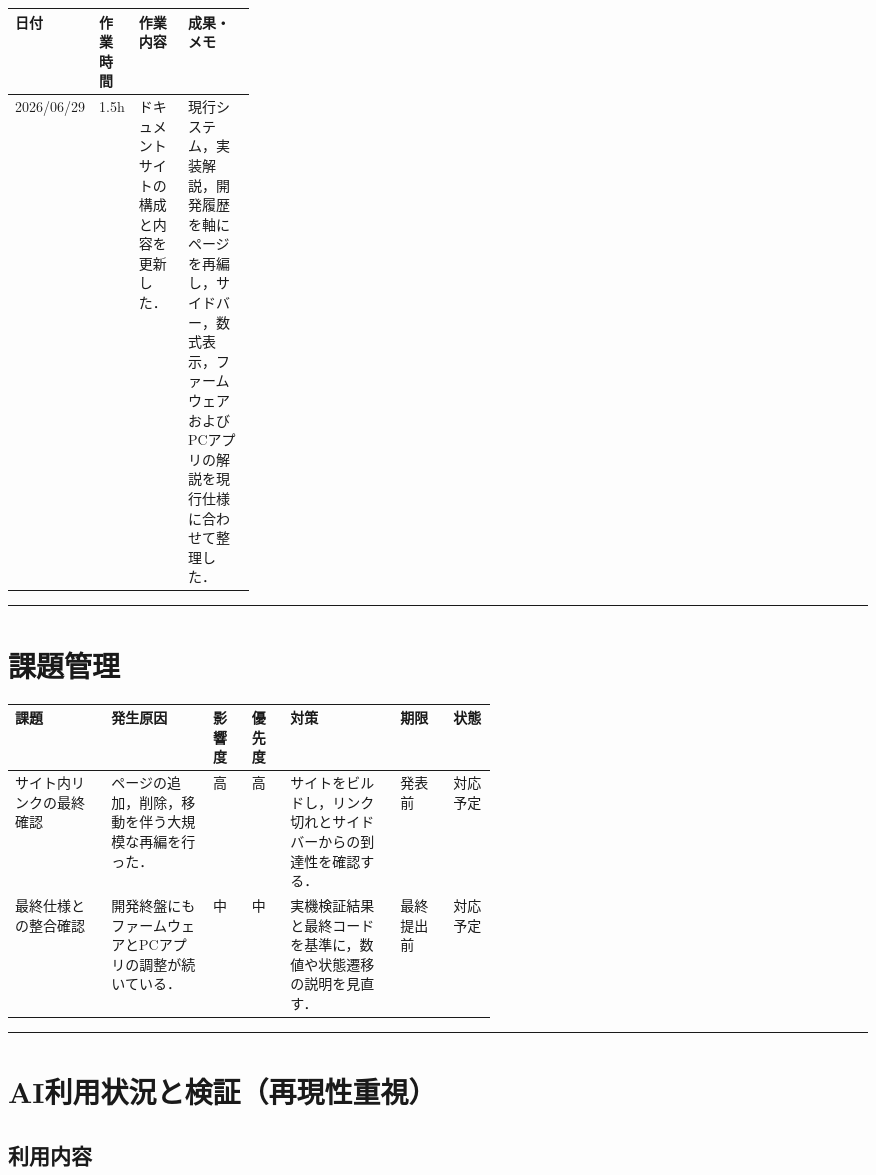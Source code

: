 \documentclass[uplatex,dvipdfmx,a4paper,11pt]{jsarticle}
\newcommand{\sectionrule}{\par\medskip\noindent\rule{\linewidth}{0.6pt}\par\medskip}
\begin{document}
\begin{tabularx}{\linewidth}{@{}p{0.16\linewidth}p{0.12\linewidth}XX@{}}
\toprule
日付 & 作業時間 & 作業内容 & 成果・メモ \\
\midrule
2026/06/29 & 1.5h & ドキュメントサイトの構成と内容を更新した． & 現行システム，実装解説，開発履歴を軸にページを再編し，サイドバー，数式表示，ファームウェアおよびPCアプリの解説を現行仕様に合わせて整理した． \\
\bottomrule
\end{tabularx}

\sectionrule

\section{課題管理}

\begin{tabularx}{\linewidth}{@{}p{0.20\linewidth}Xp{0.08\linewidth}p{0.08\linewidth}Xp{0.11\linewidth}p{0.09\linewidth}@{}}
\toprule
課題 & 発生原因 & 影響度 & 優先度 & 対策 & 期限 & 状態 \\
\midrule
サイト内リンクの最終確認 & ページの追加，削除，移動を伴う大規模な再編を行った． & 高 & 高 & サイトをビルドし，リンク切れとサイドバーからの到達性を確認する． & 発表前 & 対応予定 \\
最終仕様との整合確認 & 開発終盤にもファームウェアとPCアプリの調整が続いている． & 中 & 中 & 実機検証結果と最終コードを基準に，数値や状態遷移の説明を見直す． & 最終提出前 & 対応予定 \\
\bottomrule
\end{tabularx}

\sectionrule

\section{AI利用状況と検証（再現性重視）}

\subsection{利用内容}
\end{document}
